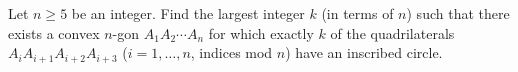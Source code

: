 Let $n\ge5$ be an integer. Find the largest integer $k$ (in terms of $n$) such that there exists a convex $n$-gon $A_1A_2\cdots A_n$ for which exactly $k$ of the quadrilaterals $A_iA_{i+1}A_{i+2}A_{i+3}$ ($i=1,\dots,n$, indices mod $n$) have an inscribed circle.
